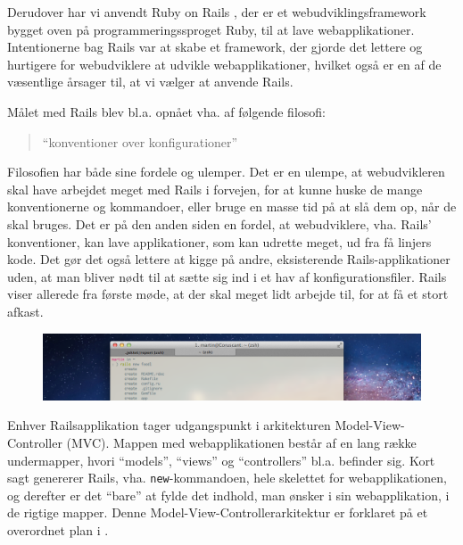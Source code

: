 Derudover har vi anvendt Ruby on Rails \cite{rubyonrailswiki}, der er et webudviklingsframework bygget oven på programmeringssproget Ruby, til at lave webapplikationer. Intentionerne bag Rails var at skabe et framework, der gjorde det lettere og hurtigere for webudviklere at udvikle webapplikationer, hvilket også er en af de væsentlige årsager til, at vi vælger at anvende Rails. 

Målet med Rails blev bl.a. opnået vha. af følgende filosofi:
\begin{quote}
``konventioner over konfigurationer''
\end{quote} 

Filosofien har både sine fordele og ulemper. Det er en ulempe, at webudvikleren skal have arbejdet meget med Rails i forvejen, for at kunne huske de mange konventionerne og kommandoer, eller bruge en masse tid på at slå dem op, når de skal bruges. Det er på den anden siden en fordel, at webudviklere, vha. Rails' konventioner, kan lave applikationer, som kan udrette meget, ud fra få linjers kode. Det gør det også lettere at kigge på andre, eksisterende Rails-applikationer uden, at man bliver nødt til at sætte sig ind i et hav af konfigurationsfiler. Rails viser allerede fra første møde, at der skal meget lidt arbejde til, for at få et stort afkast. 

\begin{figure}
	\centering
	\includegraphics[scale=0.4]{billeder/Rails-new-foodl-martin2.png}
	\label{fig:Rails-new-foodl}
\end{figure}

Enhver Railsapplikation tager udgangspunkt i arkitekturen Model-View-Controller (MVC). Mappen med webapplikationen består af en lang række undermapper, hvori ``models'', ``views'' og ``controllers'' bl.a. befinder sig. Kort sagt genererer Rails, vha. \texttt{new}-kommandoen, hele skelettet for webapplikationen, og derefter er det ``bare'' at fylde det indhold, man ønsker i sin webapplikation, i de rigtige mapper. Denne Model-View-Controllerarkitektur er forklaret på et overordnet plan i .
